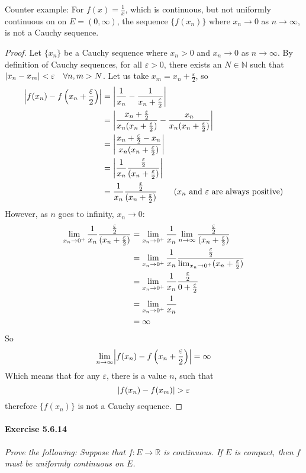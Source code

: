 \documentclass[11pt]{article}
\DeclarePairedDelimiter{\abs}{\lvert}{\rvert}
\def \R {\mathbb{R}}
\def \N {\mathbb{N}}
\def \epsilon {\varepsilon}
\def \halfepsilon {\frac{\epsilon}{2}}
\newcommand{\set}[1]{\{#1\}}
\def \limittoinfyn {\lim_{n \to \infty}}
\def \xn {x_n}
\def \xm {x_m}
\begin{document}
Counter example: For $f(x) = \frac{1}{x} $, which is continuous, but not uniformly continuous on on $E = (0, \infty)$, the sequence $\set{f(\xn)}$ where $\xn\to 0$ as $n \to \infty$, is not a Cauchy sequence. 
\begin{proof}
	Let $ \set{\xn}$ be a Cauchy sequence where $\xn > 0$ and $\xn \to 0$ as $n \to \infty$. By definition of Cauchy sequences, for all $\epsilon > 0$, there exists an $N \in \N$ such that $\abs{\xn - x_m} < \epsilon \quad \forall n, m > N$. Let us take $x_m = \xn + \halfepsilon$, so 
	\begin{align*}
		\abs*{f(\xn) - f\left(\xn + \halfepsilon\right)} &= \abs*{\frac{1}{\xn} - \frac{1}{\xn+ \halfepsilon}} \\
					&= \abs*{\frac{\xn + \halfepsilon}{\xn(\xn+ \halfepsilon)} - \frac{\xn}{\xn(\xn+ \halfepsilon)}} \\
					&= \abs*{\frac{\xn + \halfepsilon - \xn}{\xn(\xn+ \halfepsilon)}} \\
					&= \abs*{\frac{1}{\xn}\frac{\halfepsilon }{(\xn + \halfepsilon)}} \\
					&= \frac{1}{\xn}\frac{\halfepsilon }{(\xn+ \halfepsilon)} \tag{$\xn$ and $\epsilon$ are always positive}
	\end{align*}
	However, as $n$ goes to infinity, $\xn \to 0$:
	\begin{align*}
		\xntozero \frac{1}{\xn}\frac{\halfepsilon }{(\xn+ \halfepsilon)} &= \xntozero \frac{1}{\xn} \limittoinfyn \frac{\halfepsilon }{(\xn+ \halfepsilon)} \\
			&= \xntozero \frac{1}{\xn} \frac{\halfepsilon }{\xntozero(\xn+ \halfepsilon)}  \\
			&= \xntozero \frac{1}{\xn} \frac{\halfepsilon }{0 + \halfepsilon}    \\
			&= \xntozero \frac{1}{\xn} \\
			&= \infty
	\end{align*}
	So $$\limittoinfyn \abs*{f(\xn) - f\left(\xn + \halfepsilon\right)} = \infty$$
	Which means that for any $\epsilon$, there is a value $ n $, such that 
		$$\abs*{f(\xn) - f(\xm)} > \epsilon$$
	therefore $\set{f(\xn)}$ is not a Cauchy sequence.
\end{proof}

\paragraph{Exercise 5.6.14} \textit{Prove the following: Suppose that $f:E \to \R$ is continuous. If $E$ is compact, then $f$ must be uniformly continuous on $E$.}
\end{document}
